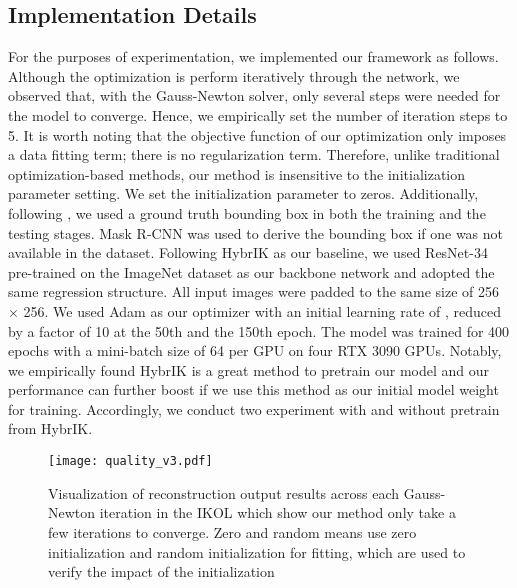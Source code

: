 \documentclass[letterpaper]{article} \usepackage{aaai23}  \usepackage{times}  \usepackage{helvet}  \usepackage{courier}  \usepackage[hyphens]{url}  \usepackage{graphicx} \urlstyle{rm} \def\UrlFont{\rm}  \usepackage{natbib}  \usepackage{caption} \frenchspacing  \setlength{\pdfpagewidth}{8.5in}  \setlength{\pdfpageheight}{11in}  \usepackage{algorithm}
\begin{document}
\subsection{Implementation Details}
For the purposes of experimentation, we implemented our framework as follows. Although the optimization is perform iteratively through the network, we observed that, with the Gauss-Newton solver, only several steps were needed for the model to converge. Hence, we empirically  set the number of iteration steps to 5. It is worth noting that the objective function of our optimization only imposes a data fitting term; there is no regularization term. Therefore, unlike traditional optimization-based methods, our method is insensitive to the initialization parameter setting. We set the initialization parameter to zeros. Additionally, following \cite{li2021hybrik,moon2020i2l}, we used a ground truth bounding box in both the training and the testing stages. Mask R-CNN \cite{he2017mask} was used to derive the bounding box if one was not available in the dataset. Following HybrIK as our baseline, we used ResNet-34 \cite{he2016deep} pre-trained on the ImageNet dataset as our backbone network and adopted the same regression structure. All input images were padded to the same size of 256 × 256. We used Adam as our optimizer with an initial learning rate of , reduced by a factor of 10 at the 50th and the 150th epoch. The model was trained for 400 epochs with a mini-batch size of 64 per GPU on four RTX 3090 GPUs. Notably, we empirically found HybrIK is a great method to pretrain our model and our performance can further boost if we use this method as our initial model weight for training. Accordingly, we conduct two experiment with and without pretrain from HybrIK.





\begin{figure*}[t]
\centering
\texttt{[image: quality\_v3.pdf]}
\caption{Visualization of reconstruction output results across each Gauss-Newton iteration  in the IKOL which show our method only take a few iterations to converge. Zero and random means use zero initialization and random initialization for fitting, which are used to verify the impact of the initialization}
\label{convergence}
\end{figure*}
\end{document}

